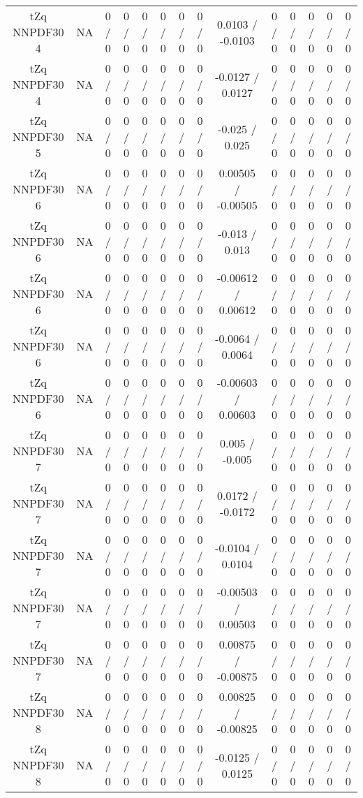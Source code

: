 \documentclass[10pt]{article}
\begin{document}
\begin{table}[htbp]
\begin{center}
\begin{tabular}{|c|c|c|c|c|c|c|c|c|c|c|c|c|c|}
  tZq NNPDF30 4 &    NA    & 0 / 0 & 0 / 0 & 0 / 0 & 0 / 0 & 0 / 0 & 0 / 0 & 0.0103 / -0.0103 & 0 / 0 & 0 / 0 & 0 / 0 & 0 / 0 & 0 / 0 \\ 
  tZq NNPDF30 4 &    NA    & 0 / 0 & 0 / 0 & 0 / 0 & 0 / 0 & 0 / 0 & 0 / 0 & -0.0127 / 0.0127 & 0 / 0 & 0 / 0 & 0 / 0 & 0 / 0 & 0 / 0 \\ 
  tZq NNPDF30 5 &    NA    & 0 / 0 & 0 / 0 & 0 / 0 & 0 / 0 & 0 / 0 & 0 / 0 & -0.025 / 0.025 & 0 / 0 & 0 / 0 & 0 / 0 & 0 / 0 & 0 / 0 \\ 
  tZq NNPDF30 6 &    NA    & 0 / 0 & 0 / 0 & 0 / 0 & 0 / 0 & 0 / 0 & 0 / 0 & 0.00505 / -0.00505 & 0 / 0 & 0 / 0 & 0 / 0 & 0 / 0 & 0 / 0 \\ 
  tZq NNPDF30 6 &    NA    & 0 / 0 & 0 / 0 & 0 / 0 & 0 / 0 & 0 / 0 & 0 / 0 & -0.013 / 0.013 & 0 / 0 & 0 / 0 & 0 / 0 & 0 / 0 & 0 / 0 \\ 
  tZq NNPDF30 6 &    NA    & 0 / 0 & 0 / 0 & 0 / 0 & 0 / 0 & 0 / 0 & 0 / 0 & -0.00612 / 0.00612 & 0 / 0 & 0 / 0 & 0 / 0 & 0 / 0 & 0 / 0 \\ 
  tZq NNPDF30 6 &    NA    & 0 / 0 & 0 / 0 & 0 / 0 & 0 / 0 & 0 / 0 & 0 / 0 & -0.0064 / 0.0064 & 0 / 0 & 0 / 0 & 0 / 0 & 0 / 0 & 0 / 0 \\ 
  tZq NNPDF30 6 &    NA    & 0 / 0 & 0 / 0 & 0 / 0 & 0 / 0 & 0 / 0 & 0 / 0 & -0.00603 / 0.00603 & 0 / 0 & 0 / 0 & 0 / 0 & 0 / 0 & 0 / 0 \\ 
  tZq NNPDF30 7 &    NA    & 0 / 0 & 0 / 0 & 0 / 0 & 0 / 0 & 0 / 0 & 0 / 0 & 0.005 / -0.005 & 0 / 0 & 0 / 0 & 0 / 0 & 0 / 0 & 0 / 0 \\ 
  tZq NNPDF30 7 &    NA    & 0 / 0 & 0 / 0 & 0 / 0 & 0 / 0 & 0 / 0 & 0 / 0 & 0.0172 / -0.0172 & 0 / 0 & 0 / 0 & 0 / 0 & 0 / 0 & 0 / 0 \\ 
  tZq NNPDF30 7 &    NA    & 0 / 0 & 0 / 0 & 0 / 0 & 0 / 0 & 0 / 0 & 0 / 0 & -0.0104 / 0.0104 & 0 / 0 & 0 / 0 & 0 / 0 & 0 / 0 & 0 / 0 \\ 
  tZq NNPDF30 7 &    NA    & 0 / 0 & 0 / 0 & 0 / 0 & 0 / 0 & 0 / 0 & 0 / 0 & -0.00503 / 0.00503 & 0 / 0 & 0 / 0 & 0 / 0 & 0 / 0 & 0 / 0 \\ 
  tZq NNPDF30 7 &    NA    & 0 / 0 & 0 / 0 & 0 / 0 & 0 / 0 & 0 / 0 & 0 / 0 & 0.00875 / -0.00875 & 0 / 0 & 0 / 0 & 0 / 0 & 0 / 0 & 0 / 0 \\ 
  tZq NNPDF30 8 &    NA    & 0 / 0 & 0 / 0 & 0 / 0 & 0 / 0 & 0 / 0 & 0 / 0 & 0.00825 / -0.00825 & 0 / 0 & 0 / 0 & 0 / 0 & 0 / 0 & 0 / 0 \\ 
  tZq NNPDF30 8 &    NA    & 0 / 0 & 0 / 0 & 0 / 0 & 0 / 0 & 0 / 0 & 0 / 0 & -0.0125 / 0.0125 & 0 / 0 & 0 / 0 & 0 / 0 & 0 / 0 & 0 / 0 \\ 

\end{tabular}
\end{center}
\end{table}
\end{document}
